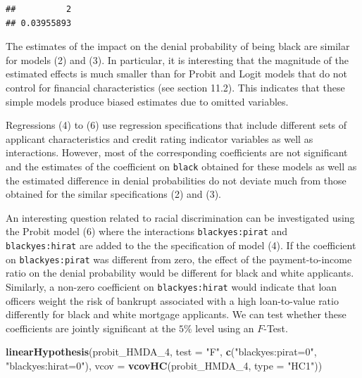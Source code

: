 \documentclass[]{book}
\newenvironment{Shaded}{\begin{snugshade}}{\end{snugshade}}
\newcommand{\KeywordTok}[1]{\textcolor[rgb]{0.13,0.29,0.53}{\textbf{#1}}}
\newcommand{\DataTypeTok}[1]{\textcolor[rgb]{0.13,0.29,0.53}{#1}}
\newcommand{\DecValTok}[1]{\textcolor[rgb]{0.00,0.00,0.81}{#1}}
\newcommand{\StringTok}[1]{\textcolor[rgb]{0.31,0.60,0.02}{#1}}
\newcommand{\NormalTok}[1]{#1}
\theoremstyle{definition}
\theoremstyle{definition}
\theoremstyle{definition}
\theoremstyle{remark}
\begin{document}
\begin{verbatim}
##          2 
## 0.03955893
\end{verbatim}

The estimates of the impact on the denial probability of being black are
similar for models (2) and (3). In particular, it is interesting that
the magnitude of the estimated effects is much smaller than for Probit
and Logit models that do not control for financial characteristics (see
section 11.2). This indicates that these simple models produce biased
estimates due to omitted variables.

Regressions (4) to (6) use regression specifications that include
different sets of applicant characteristics and credit rating indicator
variables as well as interactions. However, most of the corresponding
coefficients are not significant and the estimates of the coefficient on
\texttt{black} obtained for these models as well as the estimated
difference in denial probabilities do not deviate much from those
obtained for the similar specifications (2) and (3).

An interesting question related to racial discrimination can be
investigated using the Probit model (6) where the interactions
\texttt{blackyes:pirat} and \texttt{blackyes:hirat} are added to the the
specification of model (4). If the coefficient on
\texttt{blackyes:pirat} was different from zero, the effect of the
payment-to-income ratio on the denial probability would be different for
black and white applicants. Similarly, a non-zero coefficient on
\texttt{blackyes:hirat} would indicate that loan officers weight the
risk of bankrupt associated with a high loan-to-value ratio differently
for black and white mortgage applicants. We can test whether these
coefficients are jointly significant at the \(5\%\) level using an
\(F\)-Test.

\begin{Shaded}
\begin{Highlighting}[]
\KeywordTok{linearHypothesis}\NormalTok{(probit_HMDA_}\DecValTok{4}\NormalTok{,}
                 \DataTypeTok{test =} \StringTok{"F"}\NormalTok{,}
                 \KeywordTok{c}\NormalTok{(}\StringTok{"blackyes:pirat=0"}\NormalTok{, }\StringTok{"blackyes:hirat=0"}\NormalTok{),}
                 \DataTypeTok{vcov =} \KeywordTok{vcovHC}\NormalTok{(probit_HMDA_}\DecValTok{4}\NormalTok{, }\DataTypeTok{type =} \StringTok{"HC1"}\NormalTok{))}
\end{Highlighting}
\end{Shaded}
\end{document}
